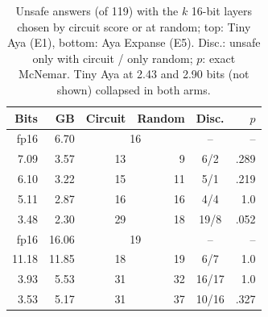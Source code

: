 \begin{table}[t]
\centering\footnotesize
\setlength{\tabcolsep}{4pt}
\begin{tabular}{@{}r r r r c r@{}}
\toprule
Bits & GB & Circuit & Random & Disc. & $p$ \\
\midrule
fp16 & 6.70 & \multicolumn{2}{c}{16} & -- & -- \\
7.09 & 3.57 & 13 & 9 & 6/2 & .289 \\
6.10 & 3.22 & 15 & 11 & 5/1 & .219 \\
5.11 & 2.87 & 16 & 16 & 4/4 & 1.0 \\
3.48 & 2.30 & 29 & 18 & 19/8 & .052 \\
\midrule
fp16 & 16.06 & \multicolumn{2}{c}{19} & -- & -- \\
11.18 & 11.85 & 18 & 19 & 6/7 & 1.0 \\
3.93 & 5.53 & 31 & 32 & 16/17 & 1.0 \\
3.53 & 5.17 & 31 & 37 & 10/16 & .327 \\
\bottomrule
\end{tabular}
\caption{Unsafe answers (of 119) with the $k$ 16-bit layers chosen by circuit score or at random; top: Tiny Aya (E1), bottom: Aya Expanse (E5). Disc.: unsafe only with circuit / only random; $p$: exact McNemar. Tiny Aya at 2.43 and 2.90 bits (not shown) collapsed in both arms.}
\label{tab:quant}
\end{table}
